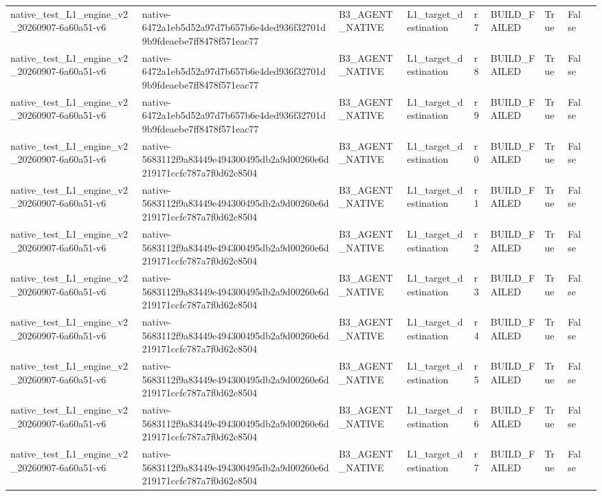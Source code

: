 \begin{tabular}{lllllllll}
native\_test\_L1\_engine\_v2\_20260907-6a60a51-v6 & native-6472a1eb5d52a97d7b657b6e4ded936f32701d9b9fdeaebe7ff8478f571eac77 & B3\_AGENT\_NATIVE & L1\_target\_destination & r7 & BUILD\_FAILED & True & False &  \\
native\_test\_L1\_engine\_v2\_20260907-6a60a51-v6 & native-6472a1eb5d52a97d7b657b6e4ded936f32701d9b9fdeaebe7ff8478f571eac77 & B3\_AGENT\_NATIVE & L1\_target\_destination & r8 & BUILD\_FAILED & True & False &  \\
native\_test\_L1\_engine\_v2\_20260907-6a60a51-v6 & native-6472a1eb5d52a97d7b657b6e4ded936f32701d9b9fdeaebe7ff8478f571eac77 & B3\_AGENT\_NATIVE & L1\_target\_destination & r9 & BUILD\_FAILED & True & False &  \\
native\_test\_L1\_engine\_v2\_20260907-6a60a51-v6 & native-5683112f9a83449e494300495db2a9d00260e6d219171ccfc787a7f0d62c8504 & B3\_AGENT\_NATIVE & L1\_target\_destination & r0 & BUILD\_FAILED & True & False &  \\
native\_test\_L1\_engine\_v2\_20260907-6a60a51-v6 & native-5683112f9a83449e494300495db2a9d00260e6d219171ccfc787a7f0d62c8504 & B3\_AGENT\_NATIVE & L1\_target\_destination & r1 & BUILD\_FAILED & True & False &  \\
native\_test\_L1\_engine\_v2\_20260907-6a60a51-v6 & native-5683112f9a83449e494300495db2a9d00260e6d219171ccfc787a7f0d62c8504 & B3\_AGENT\_NATIVE & L1\_target\_destination & r2 & BUILD\_FAILED & True & False &  \\
native\_test\_L1\_engine\_v2\_20260907-6a60a51-v6 & native-5683112f9a83449e494300495db2a9d00260e6d219171ccfc787a7f0d62c8504 & B3\_AGENT\_NATIVE & L1\_target\_destination & r3 & BUILD\_FAILED & True & False &  \\
native\_test\_L1\_engine\_v2\_20260907-6a60a51-v6 & native-5683112f9a83449e494300495db2a9d00260e6d219171ccfc787a7f0d62c8504 & B3\_AGENT\_NATIVE & L1\_target\_destination & r4 & BUILD\_FAILED & True & False &  \\
native\_test\_L1\_engine\_v2\_20260907-6a60a51-v6 & native-5683112f9a83449e494300495db2a9d00260e6d219171ccfc787a7f0d62c8504 & B3\_AGENT\_NATIVE & L1\_target\_destination & r5 & BUILD\_FAILED & True & False &  \\
native\_test\_L1\_engine\_v2\_20260907-6a60a51-v6 & native-5683112f9a83449e494300495db2a9d00260e6d219171ccfc787a7f0d62c8504 & B3\_AGENT\_NATIVE & L1\_target\_destination & r6 & BUILD\_FAILED & True & False &  \\
native\_test\_L1\_engine\_v2\_20260907-6a60a51-v6 & native-5683112f9a83449e494300495db2a9d00260e6d219171ccfc787a7f0d62c8504 & B3\_AGENT\_NATIVE & L1\_target\_destination & r7 & BUILD\_FAILED & True & False &  \\

\end{tabular}
